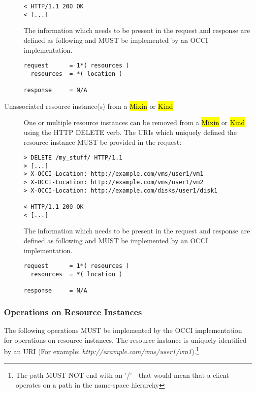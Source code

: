 \documentclass[10pt,a4paper]{article}
\begin{document}
\begin{description}
\begin{verbatim}
< HTTP/1.1 200 OK
< [...]
\end{verbatim}

    The information which needs to be present in the request and
    response are defined as following and MUST be implemented by an
    OCCI implementation.

\begin{verbatim}
request      = 1*( resources )
  resources  = *( location )

response     = N/A
\end{verbatim}

  \item[Unassociated resource instance(s) from a \hl{Mixin} or
    \hl{Kind}] One or multiple resource instances can be removed from
    a \hl{Mixin} or \hl{Kind} using the HTTP DELETE verb. The URIs
    which uniquely defined the resource instance MUST be provided in
    the request:

\begin{verbatim}
> DELETE /my_stuff/ HTTP/1.1
> [...]
> X-OCCI-Location: http://example.com/vms/user1/vm1
> X-OCCI-Location: http://example.com/vms/user1/vm2
> X-OCCI-Location: http://example.com/disks/user1/disk1

< HTTP/1.1 200 OK
< [...]
\end{verbatim}

    The information which needs to be present in the request and
    response are defined as following and MUST be implemented by an
    OCCI implementation.

\begin{verbatim}
request      = 1*( resources )
  resources  = *( location )

response     = N/A
\end{verbatim}

\end{description}

\subsubsection{Operations on Resource Instances}
\label{sec:ops_on_instances}
The following operations MUST be implemented by the OCCI
implementation for operations on resource instances. The resource
instance is uniquely identified by an URI (For example:
\emph{http://example.com/vms/user1/vm1}).\footnote{The path MUST NOT
  end with an '/' - that would mean that a client operates on a path
  in the name-space hierarchy}
\end{document}
